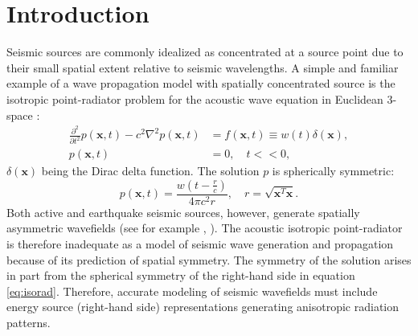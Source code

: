 \section{Introduction}

Seismic sources are commonly idealized as concentrated at a source point due
to their small spatial extent relative to seismic wavelengths.
A simple and familiar example of a wave propagation model with
spatially concentrated source is the isotropic point-radiator problem
for the acoustic wave equation in Euclidean 3-space \cite[]{CourHil:62}:
\begin{equation}\label{eq:isorad}
\begin{split}
        \frac{\partial^2}{\partial t^2} p(\mathbf x,t) - c^2\nabla^2
  p(\mathbf x,t) & = f(\mathbf x,t) \equiv w(t)\delta(\mathbf x),\\ 
p(\mathbf x,t) & =  0,  \quad t<<0,
\end{split}
\end{equation}
$\delta(\mathbf x)$ being the Dirac delta function.
The solution $p$ is spherically symmetric:
\begin{equation}
\label{eq:green3d}
	p(\mathbf x,t) = \frac{w\left(t-\frac{r}{c}\right)}{4\pi c^2 r}, \quad 
	r= \sqrt{\mathbf x^T \mathbf x}.
\end{equation}
Both active and earthquake seismic sources, however, generate
spatially asymmetric wavefields (see for example \cite{Shearer:2009}, \cite{Yil:01}). 
The acoustic isotropic point-radiator 
is therefore inadequate as a model of seismic wave generation
and propagation because of its prediction of spatial symmetry.
The symmetry of the solution arises in part from the spherical symmetry of
the right-hand side in equation \ref{eq:isorad}. Therefore, accurate
modeling of seismic wavefields must include energy source (right-hand
side) representations generating anisotropic radiation patterns.

